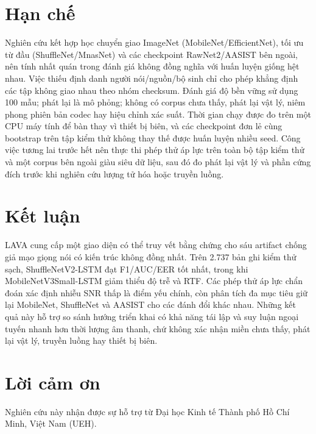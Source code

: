 \documentclass[10pt,journal,onecolumn,a4paper]{IEEEtran}
\begin{document}
\section{Hạn chế}
Nghiên cứu kết hợp học chuyển giao ImageNet (MobileNet/EfficientNet), tối ưu từ đầu (ShuffleNet/MnasNet) và các checkpoint RawNet2/AASIST bên ngoài, nên tính nhất quán trong đánh giá không đồng nghĩa với huấn luyện giống hệt nhau. Việc thiếu định danh người nói/nguồn/bộ sinh chỉ cho phép khẳng định các tập không giao nhau theo nhóm checksum. Đánh giá độ bền vững sử dụng 100 mẫu; phát lại là mô phỏng; không có corpus chưa thấy, phát lại vật lý, niêm phong phiên bản codec hay hiệu chỉnh xác suất. Thời gian chạy được đo trên một CPU máy tính để bàn thay vì thiết bị biên, và các checkpoint đơn lẻ cùng bootstrap trên tập kiểm thử không thay thế được huấn luyện nhiều seed. Công việc tương lai trước hết nên thực thi phép thử áp lực trên toàn bộ tập kiểm thử và một corpus bên ngoài giàu siêu dữ liệu, sau đó đo phát lại vật lý và phần cứng đích trước khi nghiên cứu lượng tử hóa hoặc truyền luồng.

\section{Kết luận}
LAVA cung cấp một giao diện có thể truy vết bằng chứng cho sáu artifact chống giả mạo giọng nói có kiến trúc không đồng nhất. Trên 2.737 bản ghi kiểm thử sạch, ShuffleNetV2-LSTM đạt F1/AUC/EER tốt nhất, trong khi MobileNetV3Small-LSTM giảm thiểu độ trễ và RTF. Các phép thử áp lực chẩn đoán xác định nhiễu SNR thấp là điểm yếu chính, còn phân tích đa mục tiêu giữ lại MobileNet, ShuffleNet và AASIST cho các đánh đổi khác nhau. Những kết quả này hỗ trợ so sánh hướng triển khai có khả năng tái lập và suy luận ngoại tuyến nhanh hơn thời lượng âm thanh, chứ không xác nhận miền chưa thấy, phát lại vật lý, truyền luồng hay thiết bị biên.

\section{Lời cảm ơn}
Nghiên cứu này nhận được sự hỗ trợ từ Đại học Kinh tế Thành phố Hồ Chí Minh, Việt Nam (UEH).



\end{document}
